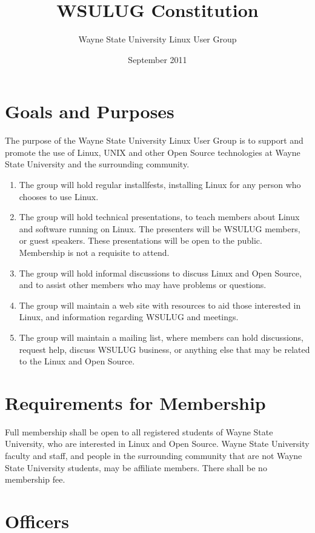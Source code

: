 \documentclass{article}
\begin{document}
\title{WSULUG Constitution}
\author{Wayne State University Linux User Group}
\date{September 2011}
\maketitle

\section{Goals and Purposes}
The purpose of the Wayne State University Linux User Group is to support and promote the use of Linux, UNIX and other Open Source technologies at Wayne State University and the surrounding community.

\begin{enumerate}
\item The group will hold regular installfests, installing Linux for any person who chooses to use Linux.
\item The group will hold technical presentations, to teach members about Linux and software running on Linux.  The presenters will be WSULUG members, or guest speakers.  These presentations will be open to the public. Membership is not a requisite to attend.
\item The group will hold informal discussions to discuss Linux and Open Source, and to assist other members who may have problems or questions.
\item The group will maintain a web site with resources to aid those interested in Linux, and information regarding WSULUG and meetings.
\item The group will maintain a mailing list, where members can hold discussions, request help, discuss WSULUG business, or anything else that may be related to the Linux and Open Source.
\end{enumerate}

\section{Requirements for Membership}
Full membership shall be open to all registered students of Wayne State University, who are interested in Linux and Open Source.  Wayne State University faculty and staff, and people in the surrounding community that are not Wayne State University students, may be affiliate members. There shall be no membership fee.

\section{Officers}
\end{document}
